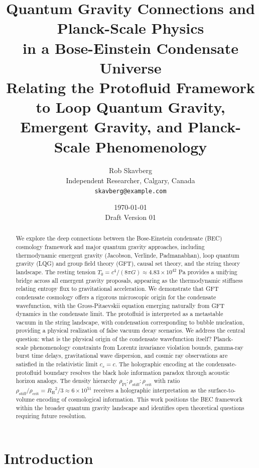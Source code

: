 \documentclass[11pt,a4paper]{article}
\title{\textbf{Quantum Gravity Connections and Planck-Scale Physics\\in a Bose-Einstein Condensate Universe}\\[0.5em]
\large Relating the Protofluid Framework to Loop Quantum Gravity,\\
Emergent Gravity, and Planck-Scale Phenomenology}
\author{Rob Skavberg\\[0.3em]
\small Independent Researcher, Calgary, Canada\\
\small \texttt{skavberg@example.com}}
\date{\today\\[0.5em]
\small Draft Version 01}
\newcommand{\rhocrit}{\ensuremath{\rho_{\mathrm{crit}}}}
\newcommand{\rhostiff}{\ensuremath{\rho_{\mathrm{stiff}}}}
\newcommand{\rhoPl}{\ensuremath{\rho_{\mathrm{Pl}}}}
\newcommand{\Tzero}{\ensuremath{T_0}}
\newcommand{\cs}{\ensuremath{c_s}}
\newcommand{\RH}{\ensuremath{R_{\mathrm{H}}}}
\theoremstyle{definition}
\theoremstyle{remark}
\begin{document}
\maketitle

\begin{abstract}
We explore the deep connections between the Bose-Einstein condensate (BEC) cosmology framework and major quantum gravity approaches, including thermodynamic emergent gravity (Jacobson, Verlinde, Padmanabhan), loop quantum gravity (LQG) and group field theory (GFT), causal set theory, and the string theory landscape. The resting tension $\Tzero = c^4/(8\pi G) \approx 4.83 \times 10^{42}$ Pa provides a unifying bridge across all emergent gravity proposals, appearing as the thermodynamic stiffness relating entropy flux to gravitational acceleration. We demonstrate that GFT condensate cosmology offers a rigorous microscopic origin for the condensate wavefunction, with the Gross-Pitaevskii equation emerging naturally from GFT dynamics in the condensate limit. The protofluid is interpreted as a metastable vacuum in the string landscape, with condensation corresponding to bubble nucleation, providing a physical realization of false vacuum decay scenarios. We address the central question: what is the physical origin of the condensate wavefunction itself? Planck-scale phenomenology constraints from Lorentz invariance violation bounds, gamma-ray burst time delays, gravitational wave dispersion, and cosmic ray observations are satisfied in the relativistic limit $\cs = c$. The holographic encoding at the condensate-protofluid boundary resolves the black hole information paradox through acoustic horizon analogs. The density hierarchy $\rhoPl : \rhostiff : \rhocrit$ with ratio $\rhostiff/\rhocrit = \RH^2/3 \approx 6 \times 10^{51}$ receives a holographic interpretation as the surface-to-volume encoding of cosmological information. This work positions the BEC framework within the broader quantum gravity landscape and identifies open theoretical questions requiring future resolution.
\end{abstract}

\tableofcontents
\newpage

\section{Introduction}
\label{sec:introduction}
\end{document}
